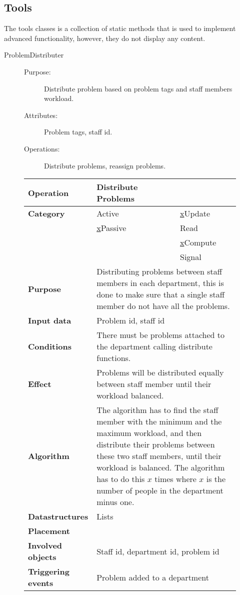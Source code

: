 \subsection{Tools}

The tools classes is a collection of static methods that is used to implement advanced functionality, however, they do not display any content. 

\begin{description}
\item[ProblemDistributer]\hfill
\begin{description}
\item[Purpose:]Distribute problem based on problem tags and staff members workload.
\item[Attributes:]Problem tags, staff id.
\item[Operations:]Distribute problems, reassign problems.
\end{description}
\end{description}

\begin{figure}
\begin{tabular}{p{3.5cm} p{4cm} p{4cm}}
\hline
\textbf{Operation}&Distribute Problems\\
\hline
\textbf{Category}&\underline{ }Active&\underline{x}Update\\
&\underline{x}Passive&\underline{ }Read\\
&&\underline{x}Compute\\
&&\underline{ }Signal\\
\textbf{Purpose}&\multicolumn{2}{p{8cm}}{Distributing problems between staff members in each department, this is done to make sure that a single staff member do not have all the problems.}\\
\textbf{Input data}&\multicolumn{2}{p{8cm}}{Problem id, staff id}\\
\textbf{Conditions}&\multicolumn{2}{p{8cm}}{There must be problems attached to the department calling distribute functions.}\\
\textbf{Effect}&\multicolumn{2}{p{8cm}}{Problems will be distributed equally between staff member until their workload balanced.}\\
\textbf{Algorithm}&\multicolumn{2}{p{8cm}}{The algorithm has to find the staff member with the minimum and the maximum workload, and then distribute their problems between these two staff members, until their workload is balanced. The algorithm has to do this $x$ times where $x$ is the number of people in the department minus one.}\\
\textbf{Datastructures}&\multicolumn{2}{p{8cm}}{Lists}\\
\textbf{Placement}&\multicolumn{2}{p{8cm}}{}\\
\textbf{Involved objects}&\multicolumn{2}{p{8cm}}{Staff id, department id, problem id}\\
\textbf{Triggering events}&\multicolumn{2}{p{8cm}}{Problem added to a department}\\
\hline
\end{tabular}
\end{figure}

